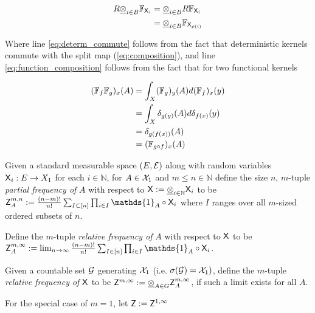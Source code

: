 \begin{align}
    R \underline{\otimes}_{i\in B} \mathbb{F}_{\mathsf{X}_i} &= \underline{\otimes}_{i\in B} R \mathbb{F}_{\mathsf{X}_{i}}\label{eq:determ_commute}\\
                                               &= \underline{\otimes}_{i\in B} \mathbb{F}_{\mathsf{X}_{\rho(i)}}\label{eq:function_composition}
\end{align}

Where line \ref{eq:determ_commute} follows from the fact that deterministic kernels commute with the split map (\ref{eq:composition}), and line \ref{eq:function_composition} follows from the fact that for two functional kernels 

\begin{align}
    (\mathbb{F}_{f}\mathbb{F}_g)_x(A) &= \int_X (\mathbb{F}_g)_y(A) d(\mathbb{F}_f)_x(y)\\
                                      &= \int_X \delta_{g(y)}(A) d\delta_{f(x)}(y)\\
                                      &= \delta_{g(f(x))} (A)\\
                                      &= (\mathbb{F}_{g\circ f})_x(A) 
\end{align}


\begin{definition}\label{def:partial_freq}
Given a standard measurable space $(E,\mathcal{E})$ along with random variables $\mathsf{X}_i:E\to X_1$ for each $i\in \mathbb{N}$, for $A\in \mathcal{X}_1$ and $m\leq n\in \mathbb{N}$ define the size $n$, $m$-tuple \emph{partial frequency of} $A$ with respect to $\mathsf{X}:=\underline{\otimes}_{i\in\mathbb{N}}\mathsf{X}_i$ to be $\RV{Z}^{m,n}_A:=\frac{(n-m)!}{n!}\sum_{I\subset [n]} \prod_{i\in I} \mathds{1}_A\circ \RV{X}_i$ where $I$ ranges over all $m$-sized ordered subsets of $n$.

Define the $m$-tuple \emph{relative frequency of } $A$ with respect to $\mathsf{X}$ to be $\RV{Z}^{m,\infty}_A:= \lim_{n\to \infty}\frac{(n-m)!}{n!}\sum_{I\in [n]} \prod_{i\in I} \mathds{1}_A\circ \RV{X}_i$.

Given a countable set $\mathcal{G}$ generating $\mathcal{X}_1$ (i.e. $\sigma(\mathcal{G})=\mathcal{X}_1)$, define the $m$-tuple \emph{relative frequency of} $\mathsf{X}$ to be $\mathsf{Z}^{m,\infty}:=\underline{\otimes}_{A\in G} \mathsf{Z}^{m,\infty}_A$, if such a limit exists for all $A$.

For the special case of $m=1$, let $\mathsf{Z}:=\mathsf{Z}^{1,\infty}$
\end{definition}


